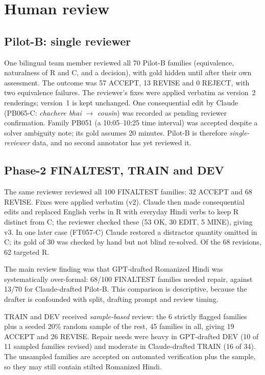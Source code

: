 \documentclass[12pt,a4paper,oneside]{report}
\renewcommand{\_}{\oldunderscore\allowbreak}
\begin{document}
\section{Human review}
\label{sec:review}

\subsection{Pilot-B: single reviewer}

One bilingual team member reviewed all 70 Pilot-B families (equivalence, naturalness of R and C, and a decision), with gold hidden until after their own assessment. The outcome was 57 ACCEPT, 13 REVISE and 0 REJECT, with two equivalence failures. The reviewer's fixes were applied verbatim as version~2 renderings; version~1 is kept unchanged. One consequential edit by Claude (PB065-C: \emph{chachere bhai} $\to$ \emph{cousin}) was recorded as pending reviewer confirmation. Family PB051 (a 10:05--10:25 time interval) was accepted despite a solver ambiguity note; its gold assumes 20 minutes. Pilot-B is therefore \emph{single-reviewer} data, and no second annotator has yet reviewed it.

\subsection{Phase-2 FINAL\_TEST, TRAIN and DEV}

The same reviewer reviewed all 100 FINAL\_TEST families: 32 ACCEPT and 68 REVISE. Fixes were applied verbatim (v2). Claude then made consequential edits and replaced English verbs in R with everyday Hindi verbs to keep R distinct from C; the reviewer checked these (53 OK, 30 EDIT, 5 MINE), giving v3. In one later case (FT057-C) Claude restored a distractor quantity omitted in C; its gold of 30 was checked by hand but not blind re-solved. Of the 68 revisions, 62 targeted R.

The main review finding was that GPT-drafted Romanized Hindi was systematically over-formal: 68/100 FINAL\_TEST families needed repair, against 13/70 for Claude-drafted Pilot-B. This comparison is descriptive, because the drafter is confounded with split, drafting prompt and review timing.

TRAIN and DEV received \emph{sample-based} review: the 6 strictly flagged families plus a seeded 20\% random sample of the rest, 45 families in all, giving 19 ACCEPT and 26 REVISE. Repair needs were heavy in GPT-drafted DEV (10 of 11 sampled families revised) and moderate in Claude-drafted TRAIN (16 of 34). The unsampled families are accepted on automated verification plus the sample, so they may still contain stilted Romanized Hindi.
\end{document}
